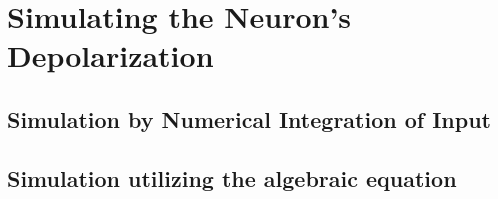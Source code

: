 
\section{Simulating the Neuron's Depolarization}

	\subsection{Simulation by Numerical Integration of Input} %
	\subsection{Simulation utilizing the algebraic equation}

